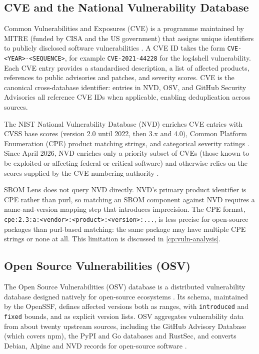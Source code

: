 \subsection{CVE and the National Vulnerability Database}
\label{sec:cve-nvd}

Common Vulnerabilities and Exposures (CVE) is a programme maintained by MITRE (funded by CISA and the US government) that assigns unique identifiers to publicly disclosed software vulnerabilities \citep{MITRE_CVE}. A CVE ID takes the form \texttt{CVE-<YEAR>-<SEQUENCE>}, for example \texttt{CVE-2021-44228} for the log4shell vulnerability. Each CVE entry provides a standardised description, a list of affected products, references to public advisories and patches, and severity scores. CVE is the canonical cross-database identifier: entries in NVD, OSV, and GitHub Security Advisories all reference CVE IDs when applicable, enabling deduplication across sources.

The NIST National Vulnerability Database (NVD) enriches CVE entries with CVSS base scores (version 2.0 until 2022, then 3.x and 4.0), Common Platform Enumeration (CPE) product matching strings, and categorical severity ratings \citep{NVD}. Since April 2026, NVD enriches only a priority subset of CVEs (those known to be exploited or affecting federal or critical software) and otherwise relies on the scores supplied by the CVE numbering authority \citep{NVD2026}.

SBOM Lens does not query NVD directly. NVD's primary product identifier is CPE rather than purl, so matching an SBOM component against NVD requires a name-and-version mapping step that introduces imprecision. The CPE format, \texttt{cpe:2.3:a:<vendor>:<product>:<version>:...}, is less precise for open-source packages than purl-based matching: the same package may have multiple CPE strings or none at all. This limitation is discussed in \autoref{cp:vuln-analysis}.


\subsection{Open Source Vulnerabilities (OSV)}
\label{sec:osv}

The Open Source Vulnerabilities (OSV) database is a distributed vulnerability database designed natively for open-source ecosystems \citep{OSV}. Its schema, maintained by the OpenSSF, defines affected versions both as ranges, with \texttt{introduced} and \texttt{fixed} bounds, and as explicit version lists. OSV aggregates vulnerability data from about twenty upstream sources, including the GitHub Advisory Database (which covers npm), the PyPI and Go databases and RustSec, and converts Debian, Alpine and NVD records for open-source software \citep{OSV}.

